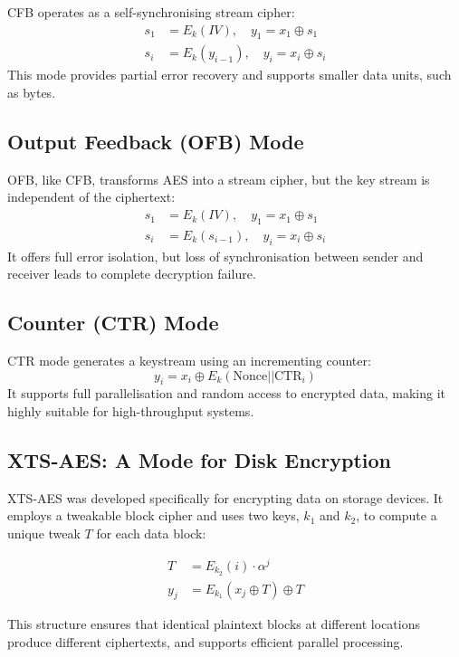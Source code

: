 CFB operates as a self-synchronising stream cipher:
\[
\begin{aligned}
s_1 &= E_k(IV), \quad y_1 = x_1 \oplus s_1 \\
s_i &= E_k(y_{i-1}), \quad y_i = x_i \oplus s_i
\end{aligned}
\]
This mode provides partial error recovery and supports smaller data units, such as bytes.

\subsection{Output Feedback (OFB) Mode}

OFB, like CFB, transforms AES into a stream cipher, but the key stream is independent of the ciphertext:
\[
\begin{aligned}
s_1 &= E_k(IV), \quad y_1 = x_1 \oplus s_1 \\
s_i &= E_k(s_{i-1}), \quad y_i = x_i \oplus s_i
\end{aligned}
\]
It offers full error isolation, but loss of synchronisation between sender and receiver leads to complete decryption failure.

\subsection{Counter (CTR) Mode}

CTR mode generates a keystream using an incrementing counter:
\[
y_i = x_i \oplus E_k(\text{Nonce} || \text{CTR}_i)
\]
It supports full parallelisation and random access to encrypted data, making it highly suitable for high-throughput systems.

\subsection{XTS-AES: A Mode for Disk Encryption}

XTS-AES was developed specifically for encrypting data on storage devices. 
It employs a tweakable block cipher and uses two keys, $k_1$ and $k_2$, 
to compute a unique tweak $T$ for each data block:

\[
\begin{aligned}
T &= E_{k_2}(i) \cdot \alpha^j \\
y_j &= E_{k_1}(x_j \oplus T) \oplus T
\end{aligned}
\]

This structure ensures that identical plaintext blocks at different locations produce different ciphertexts, and supports efficient parallel processing.

